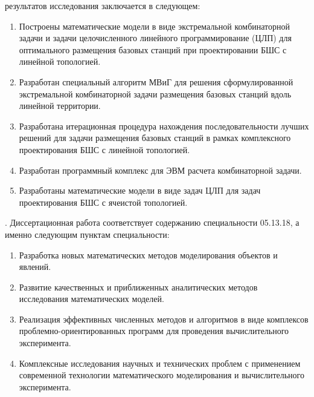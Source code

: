 {\novelty} результатов исследования заключается в следующем:
\begin{enumerate}[beginpenalty=10000] %
  \item Построены математические модели в виде экстремальной комбинаторной задачи и задачи целочисленного линейного программирование (ЦЛП) для оптимального размещения базовых станций при проектировании БШС с линейной топологией.  
  \item Разработан специальный алгоритм МВиГ для решения сформулированной экстремальной комбинаторной задачи размещения базовых станций вдоль линейной территории.
  \item Разработана итерационная процедура нахождения последовательности лучших решений для задачи размещения базовых станций в рамках комплексного проектирования БШС с линейной топологией.
  \item Разработан программный комплекс для ЭВМ расчета комбинаторной задачи.
  \item Разработаны математические модели в виде задач ЦЛП для задач проектирования БШС с ячеистой топологией.
\end{enumerate}

{\fieldresearch}. Диссертационная работа соответствует содержанию специальности 05.13.18, а именно следующим пунктам специальности:
\begin{enumerate}
    \item Разработка новых математических методов моделирования объектов и явлений.
    \item Развитие качественных и приближенных аналитических методов исследования математических моделей.
    \item Реализация эффективных численных методов и алгоритмов в виде комплексов проблемно-ориентированных программ для проведения вычислительного эксперимента.
    \item Комплексные исследования научных и технических проблем с применением современной технологии математического моделирования и вычислительного эксперимента.
\end{enumerate}

